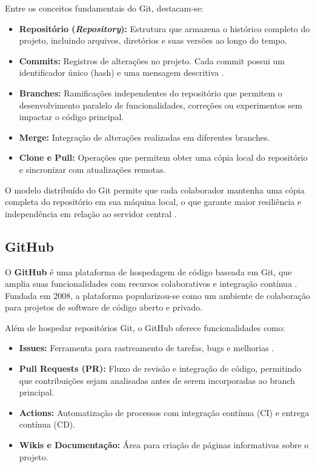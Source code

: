 Entre os conceitos fundamentais do Git, destacam-se:

\begin{itemize}
\item \textbf{Repositório (\textit{Repository}):} Estrutura que armazena o histórico completo do projeto, incluindo arquivos, diretórios e suas versões ao longo do tempo.
\item \textbf{Commits:} Registros de alterações no projeto. Cada commit possui um identificador único (hash) e uma mensagem descritiva \cite{chacon_git}.
\item \textbf{Branches:} Ramificações independentes do repositório que permitem o desenvolvimento paralelo de funcionalidades, correções ou experimentos sem impactar o código principal.
\item \textbf{Merge:} Integração de alterações realizadas em diferentes branches.
\item \textbf{Clone e Pull:} Operações que permitem obter uma cópia local do repositório e sincronizar com atualizações remotas.
\end{itemize}

O modelo distribuído do Git permite que cada colaborador mantenha uma cópia completa do repositório em sua máquina local, o que garante maior resiliência e independência em relação ao servidor central \cite{chacon_git}.

\subsection{GitHub}
\label{subsec:github}

O \textbf{GitHub} é uma plataforma de hospedagem de código baseada em Git, que amplia suas funcionalidades com recursos colaborativos e integração contínua \cite{github_official}. Fundada em 2008, a plataforma popularizou-se como um ambiente de colaboração para projetos de software de código aberto e privado.

Além de hospedar repositórios Git, o GitHub oferece funcionalidades como:

\begin{itemize}
\item \textbf{Issues:} Ferramenta para rastreamento de tarefas, bugs e melhorias \cite{github_official}.
\item \textbf{Pull Requests (PR):} Fluxo de revisão e integração de código, permitindo que contribuições sejam analisadas antes de serem incorporadas ao branch principal.
\item \textbf{Actions:} Automatização de processos com integração contínua (CI) e entrega contínua (CD).
\item \textbf{Wikis e Documentação:} Área para criação de páginas informativas sobre o projeto.
\end{itemize}


